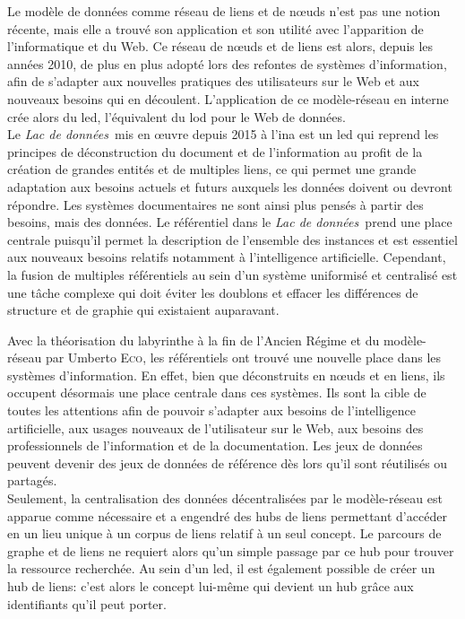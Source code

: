 \documentclass[a4paper,12pt,twoside]{book}
\newcommand{\ldd}{\textit{Lac de données~}}
\newcommand{\nP}[2]{#1 \textsc{#2}}
\begin{document}
	Le modèle de données comme réseau de liens et de nœuds n'est pas une notion récente, mais elle a trouvé son application et son utilité avec l'apparition de l'informatique et du Web. Ce réseau de nœuds et de liens est alors, depuis les années 2010, de plus en plus adopté lors des refontes de systèmes d'information, afin de s'adapter aux nouvelles pratiques des utilisateurs sur le Web et aux nouveaux besoins qui en découlent. L'application de ce modèle-réseau en interne crée alors du \ac{led}, l'équivalent du \ac{lod} pour le Web de données.\\
	
	Le \ldd mis en œuvre depuis 2015 à l'\ac{ina} est un \ac{led} qui reprend les principes de déconstruction du document et de l'information au profit de la création de grandes entités et de multiples liens, ce qui permet une grande adaptation aux besoins actuels et futurs auxquels les données doivent ou devront répondre. Les systèmes documentaires ne sont ainsi plus pensés à partir des besoins, mais des données. Le référentiel dans le \ldd prend une place centrale puisqu'il permet la description de l'ensemble des instances et est essentiel aux nouveaux besoins relatifs notamment à l'intelligence artificielle. Cependant, la fusion de multiples référentiels au sein d'un système uniformisé et centralisé est une tâche complexe qui doit éviter les doublons et effacer les différences de structure et de graphie qui existaient auparavant.
	
	
	
	
	
	\newpage
	
	Avec la théorisation du labyrinthe à la fin de l'Ancien Régime et du modèle-réseau par \nP{Umberto}{Eco}, les référentiels ont trouvé une nouvelle place dans les systèmes d'information. En effet, bien que déconstruits en nœuds et en liens, ils occupent désormais une place centrale dans ces systèmes. Ils sont la cible de toutes les attentions afin de pouvoir s'adapter aux besoins de l'intelligence artificielle, aux usages nouveaux de l'utilisateur sur le Web, aux besoins des professionnels de l'information et de la documentation. Les jeux de données peuvent devenir des jeux de données de référence dès lors qu'il sont réutilisés ou partagés.\\
	
	Seulement, la centralisation des données décentralisées par le modèle-réseau est apparue comme nécessaire et a engendré des hubs de liens permettant d'accéder en un lieu unique à un corpus de liens relatif à un seul concept. Le parcours de graphe et de liens ne requiert alors qu'un simple passage par ce hub pour trouver la ressource recherchée. Au sein d'un \ac{led}, il est également possible de créer un hub de liens: c'est alors le concept lui-même qui devient un hub grâce aux identifiants qu'il peut porter.\\
	
\end{document}
